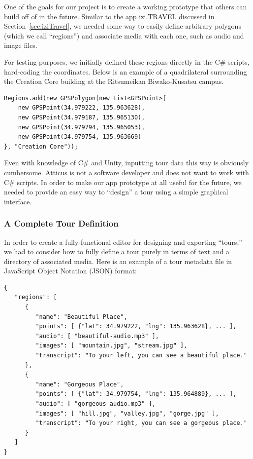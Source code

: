 \documentclass[a4paper, 10pt, american, titlepage]{article}
\begin{document}
One of the goals for our project is to create a working prototype that others
can build off of in the future. Similar to the app izi.TRAVEL discussed in
Section~\ref{sec:iziTravel}, we needed some way to easily define arbitrary
polygons (which we call ``regions'') and associate media with each one, such as
audio and image files.

For testing purposes, we initially defined these regions directly in the C\#
scripts, hard-coding the coordinates. Below is an example of a quadrilateral
surrounding the Creation Core building at the Ritsumeikan Biwako-Kusatsu campus.

\begin{verbatim}
Regions.add(new GPSPolygon(new List<GPSPoint>{
    new GPSPoint(34.979222, 135.963628),
    new GPSPoint(34.979187, 135.965130),
    new GPSPoint(34.979794, 135.965053),
    new GPSPoint(34.979754, 135.963669)
}, "Creation Core"));
\end{verbatim}

Even with knowledge of C\# and Unity, inputting tour data this way is obviously
cumbersome. Atticus is not a software developer and does not want to work with
C\# scripts. In order to make our app prototype at all useful for the future,
we needed to provide an easy way to ``design'' a tour using a simple graphical
interface.

\subsubsection{A Complete Tour Definition}
\label{sec:tourDefinition}

In order to create a fully-functional editor for designing and exporting
``tours,'' we had to consider how to fully define a tour purely in terms of text
and a directory of associated media. Here is an example of a tour metadata file
in JavaScript Object Notation (JSON) format:

\begin{verbatim}
{
   "regions": [
      {
         "name": "Beautiful Place",
         "points": [ {"lat": 34.979222, "lng": 135.963628}, ... ],
         "audio": [ "beautiful-audio.mp3" ],
         "images": [ "mountain.jpg", "stream.jpg" ],
         "transcript": "To your left, you can see a beautiful place."
      },
      {
         "name": "Gorgeous Place",
         "points": [ {"lat": 34.979754, "lng": 135.964889}, ... ],
         "audio": [ "gorgeous-audio.mp3" ],
         "images": [ "hill.jpg", "valley.jpg", "gorge.jpg" ],
         "transcript": "To your right, you can see a gorgeous place."
      }
   ]
}
\end{verbatim}
\end{document}
